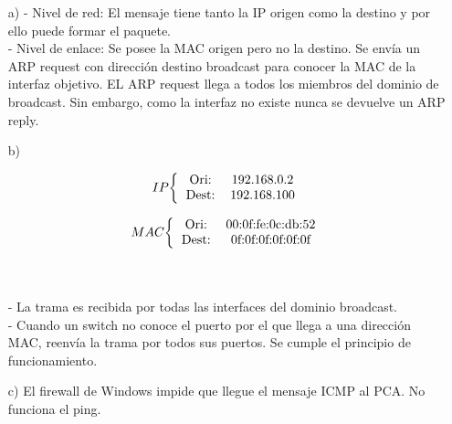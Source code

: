 \documentclass[a4paper,12pt,twoside]{article}
\begin{document}
\begin{itemize}
\item[a)] - Nivel de red: El mensaje tiene tanto la IP origen como la destino y por ello puede formar el paquete.\\
- Nivel de enlace: Se posee la MAC origen pero no la destino. Se envía un ARP request con dirección destino broadcast para conocer la MAC de la interfaz objetivo. EL ARP request llega a todos los miembros del dominio de broadcast. Sin embargo, como la interfaz no existe nunca se devuelve un ARP reply.
\item[b)] 
\begin{minipage}[c]{0.5\linewidth}
\[
\left.IP \bigg\{
\begin{tabular}{c c}
Ori: & 192.168.0.2\\
Dest: & 192.168.100\\
\end{tabular}
\right.
\]
\end{minipage}
\begin{minipage}[c]{0.5\linewidth}
\[
\left.MAC \bigg\{
\begin{tabular}{c c}
Ori: & 00:0f:fe:0c:db:52\\
Dest: & 0f:0f:0f:0f:0f:0f\\
\end{tabular}
\right.
\]
\end{minipage}
\\
\\
- La trama es recibida por todas las interfaces del dominio broadcast.\\
- Cuando un switch no conoce el puerto por el que llega a una dirección MAC, reenvía la trama por todos sus puertos. Se cumple el principio de funcionamiento.
\item[c)] El firewall de Windows impide que llegue el mensaje ICMP al PCA. No funciona el ping.
\end{itemize}
\end{document}
